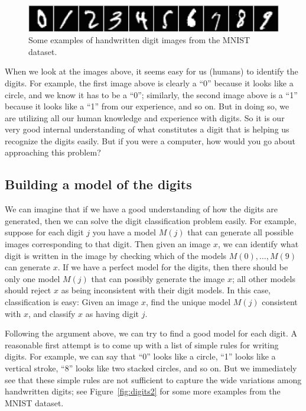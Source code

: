 \documentclass[11pt]{article}
\begin{document}
\begin{figure}[h!]
\centering
\includegraphics[scale=0.35]{digits.png}
\caption{Some examples of handwritten digit images from the MNIST dataset.}
\label{fig:digits}
\end{figure}

When we look at the images above, it seems easy for us (humans) to identify the digits. For example, the first image above is clearly a ``0'' because it looks like a circle, and we know it has to be a ``0''; similarly, the second image above is a ``1'' because it looks like a ``1'' from our experience, and so on. But in doing so, we are utilizing all our human knowledge and experience with digits. So it is our very good internal understanding of what constitutes a digit that is helping us recognize the digits easily. But if you were a computer, how would you go about approaching this problem?


\subsection*{Building a model of the digits}

We can imagine that if we have a good understanding of how the digits are generated, then we can solve the digit classification problem easily. For example, suppose for each digit $j$ you have a model $M(j)$ that can generate all possible images corresponding to that digit. Then given an image $x$, we can identify what digit is written in the image by checking which of the models $M(0),\dots,M(9)$ can generate $x$. If we have a perfect model for the digits, then there should be only one model $M(j)$ that can possibly generate the image $x$; all other models should reject $x$ as being inconsistent with their digit models. In this case, classification is easy: Given an image $x$, find the unique model $M(j)$ consistent with $x$, and classify $x$ as having digit $j$.

Following the argument above, we can try to find a good model for each digit. A reasonable first attempt is to come up with a list of simple rules for writing digits. For example, we can say that ``0'' looks like a circle, ``1'' looks like a vertical stroke, ``8'' looks like two stacked circles, and so on. But we immediately see that these simple rules are not sufficient to capture the wide variations among handwritten digits; see Figure~\ref{fig:digits2} for some more examples from the MNIST dataset.
\end{document}
